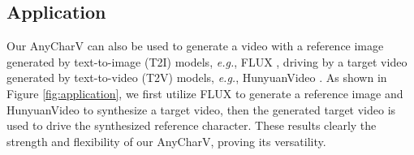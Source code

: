\subsection{Application}


Our AnyCharV can also be used to generate a video with a reference image generated by text-to-image (T2I) models, {\it e.g.}, FLUX \cite{flux2023}, driving by a target video generated by text-to-video (T2V) models, {\it e.g.}, HunyuanVideo \cite{kong2024hunyuanvideo}.
As shown in Figure \ref{fig:application}, we first utilize FLUX to generate a reference image and HunyuanVideo to synthesize a target video, then the generated target video is used to drive the synthesized reference character.
These results clearly the strength and flexibility of our AnyCharV, proving its versatility.



